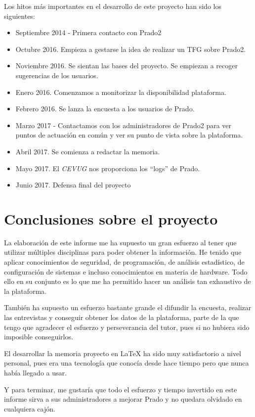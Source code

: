 Los hitos más importantes en el desarrollo de este proyecto han sido los siguientes:

\begin{itemize}
	\item Septiembre 2014 - Primera contacto con Prado2

    \item Octubre 2016. Empieza a gestarse la idea de realizar un TFG sobre Prado2.

    \item Noviembre 2016. Se sientan las bases del proyecto. Se empiezan a recoger sugerencias de los usuarios.

    \item Enero 2016. Comenzamos a monitorizar la disponibilidad plataforma.

    \item Febrero 2016. Se lanza la encuesta a los usuarios de Prado.

    \item Marzo 2017 - Contactamos con los administradores de Prado2 para ver puntos de actuación en común y ver su punto de vista sobre la plataforma.

    \item Abril 2017. Se comienza a redactar la memoria.

    \item Mayo 2017. El \textit{CEVUG} nos proporciona los ``logs'' de Prado.

    \item Junio 2017. Defensa final del proyecto

\end{itemize}

\section{Conclusiones sobre el proyecto}

La elaboración de este informe me ha supuesto un gran esfuerzo al tener que utilizar múltiples disciplinas para poder obtener la información. He tenido que aplicar conocimientos de seguridad, de programación, de análisis estadístico, de configuración de sistemas e incluso conocimientos en materia de hardware. Todo ello en su conjunto es lo que me ha permitido hacer un análisis tan exhaustivo de la plataforma.

\bigskip
También ha supuesto un esfuerzo bastante grande el difundir la encuesta, realizar las entrevistas y conseguir obtener los datos de la plataforma, parte de la que tengo que agradecer el esfuerzo y perseverancia del tutor, pues si no hubiera sido imposible conseguirlos.

\bigskip
El desarrollar la memoria proyecto en LaTeX ha sido muy satisfactorio a nivel personal, pues era una tecnología que conocía desde hace tiempo pero que nunca había llegado a usar.

\bigskip
Y para terminar, me gustaría que todo el esfuerzo y tiempo invertido en este informe sirva a sus administradores a mejorar Prado y no quedara olvidado en cualquiera cajón.


